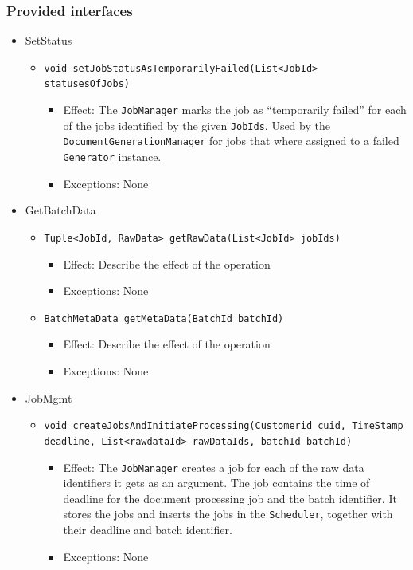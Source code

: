 \documentclass[a4paper,10pt]{article}
\begin{document}
\subsubsection*{Provided interfaces}
\begin{itemize}
    \item SetStatus
    \begin{itemize}
        \item \texttt{void setJobStatusAsTemporarilyFailed(List<JobId> statusesOfJobs)}
        \begin{itemize}
            \item Effect: The \texttt{JobManager} marks the job as ``temporarily failed'' for each of the jobs identified by the given \texttt{JobIds}. Used by the \texttt{DocumentGenerationManager} for jobs that where assigned to a failed \texttt{Generator} instance.
            \item Exceptions: None
        \end{itemize}
    \end{itemize}
    
	\item GetBatchData
    \begin{itemize}
        \item \texttt{Tuple<JobId, RawData> getRawData(List<JobId> jobIds)}
        \begin{itemize}
            \item Effect: Describe the effect of the operation
            \item Exceptions: None
        \end{itemize}
        \item \texttt{BatchMetaData getMetaData(BatchId batchId)}
        \begin{itemize}
            \item Effect: Describe the effect of the operation
            \item Exceptions: None
        \end{itemize}
    \end{itemize}    

    \item JobMgmt
    \begin{itemize}
    	\item \texttt{void createJobsAndInitiateProcessing(Customerid cuid, TimeStamp deadline, List<rawdataId> rawDataIds, batchId batchId)}
    	\begin{itemize}
            \item Effect: The \texttt{JobManager} creates a job for each of the raw data identifiers it gets as an argument. The job contains the time of deadline for the document processing job and the batch identifier. It stores the jobs and inserts the jobs in the \texttt{Scheduler}, together with their deadline and batch identifier.
            \item Exceptions: None
        \end{itemize}
    	

\end{itemize}
\end{itemize}
\end{document}
